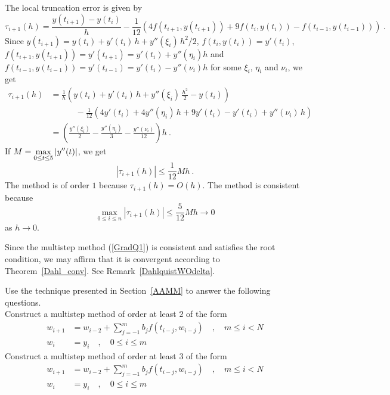 { The local truncation error is given by 
\[
\tau_{i+1}(h) = \frac{y(t_{i+1}) - y(t_i)}{h} - \frac{1}{12}
\left( 4 f(t_{i+1},y(t_{i+1})) + 9f(t_i,y(t_i)) -f(t_{i-1},y(t_{i-1}))
\right) \ .
\]
Since
$y(t_{i+1}) = y(t_i) + y'(t_i)\,h + y''(\xi_i)\,h^2/2$,
$f(t_i,y(t_i)) = y'(t_i)$,
$f(t_{i+1},y(t_{i+1})) = y'(t_{i+1}) = y'(t_i) + y''(\eta_i) h$ and
$f(t_{i-1},y(t_{i-1})) = y'(t_{i-1}) = y'(t_i) - y''(\nu_i) h$
for some $\xi_i$, $\eta_i$ and $\nu_i$, we get
\begin{align*}
\tau_{i+1}(h) &= \frac{1}{h}
\left(y(t_i) + y'(t_i)\,h + y''(\xi_i)\,\frac{h^2}{2} - y(t_i) \right) \\
&\qquad \quad - \frac{1}{12}
\left(4y'(t_i) + 4y''(\eta_i)\,h + 9 y'(t_i) - y'(t_i) + y''(\nu_i)\,h
\right) \\
& = \left( \frac{y''(\xi_i)}{2}
- \frac{y''(\eta_i)}{3} - \frac{y''(\nu_i)}{12}\right)h \ .
\end{align*}
If $\displaystyle M= \max_{0 \leq t \leq 5} | y''(t) |$, we get
\[
| \tau_{i+1}(h) | \leq \frac{1}{12} M h \ .
\]
The method is of order $1$ because $\tau_{i+1}(h) = O(h)$.
The method is consistent because
\[
\max_{0\leq i \leq n} | \tau_{i+1}(h) | \leq \frac{5}{12} M h
\rightarrow 0
\]
as $h\rightarrow 0$.

Since the multistep method (\ref{GradQ1}) is consistent and satisfies
the root condition, we may affirm that it is convergent according to
Theorem~\ref{Dahl_conv}.  See Remark~\ref{DahlquistWOdelta}.
}

\begin{question}
Use the technique presented in Section~\ref{AAMM} to answer the
following questions.\\
 Construct a multistep method of order at least $2$
of the form
\begin{align*}
w_{i+1} &= w_{i-2} + \sum_{j=-1}^m b_j f(t_{i-j},w_{i-j}) \quad ,
\quad  m \leq i < N \\
w_i &= y_i \quad , \quad 0 \leq i \leq m
\end{align*}
 Construct a multistep method of order at least $3$
of the form
\begin{align*}
w_{i+1} &= w_{i-2} + \sum_{j=-1}^m b_j f(t_{i-j},w_{i-j}) \quad ,
\quad m \leq i < N \\
w_i &= y_i \quad , \quad 0 \leq i \leq m
\end{align*}
\end{question}

